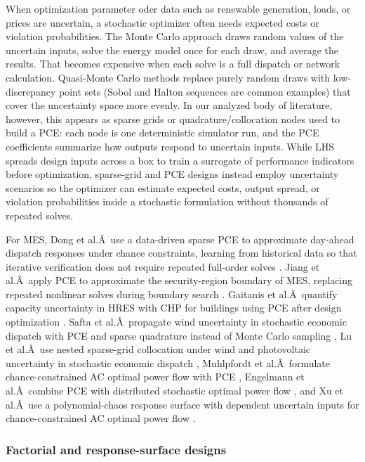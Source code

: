 \documentclass[final,5p,times,twocolumn]{elsarticle}
\begin{document}
When optimization parameter oder data such as renewable generation,
loads, or prices are uncertain, a stochastic optimizer often needs
expected costs or violation probabilities. The Monte Carlo approach
draws random values of the uncertain inputs, solve the energy model once
for each draw, and average the results. That becomes expensive when each
solve is a full dispatch or network calculation. Quasi-Monte Carlo
methods replace purely random draws with low-discrepancy point sets
(Sobol and Halton sequences are common examples) that cover the
uncertainty space more evenly. In our analyzed body of literature,
however, this appears as sparse grids or quadrature/collocation nodes
used to build a PCE: each node is one deterministic simulator run, and
the PCE coefficients summarize how outputs respond to uncertain inputs.
While LHS spreads design inputs across a box to train a surrogate of
performance indicators before optimization, sparse-grid and PCE designs
instead employ uncertainty scenarios so the optimizer can estimate
expected costs, output spread, or violation probabilities inside a
stochastic formulation without thousands of repeated solves.

For MES, Dong et al.Â~use a data-driven sparse PCE to approximate
day-ahead dispatch responses under chance constraints, learning from
historical data so that iterative verification does not require repeated
full-order solves \cite{Dong2023}. Jiang et al.Â~apply PCE to approximate the
security-region boundary of MES, replacing repeated nonlinear solves
during boundary search \cite{Jiang2026620}. Gaitanis et al.Â~quantify
capacity uncertainty in HRES with CHP for buildings using PCE after
design optimization \cite{Gaitanis2026}. Safta et al.Â~propagate wind
uncertainty in stochastic economic dispatch with PCE and sparse
quadrature instead of Monte Carlo sampling \cite{Safta20172535}, Lu et
al.Â~use nested sparse-grid collocation under wind and photovoltaic
uncertainty in stochastic economic dispatch \cite{Lu201991827}, Muhlpfordt
et al.Â~formulate chance-constrained AC optimal power flow with PCE
\cite{Muhlpfordt20194806}, Engelmann et al.Â~combine PCE with distributed
stochastic optimal power flow \cite{Engelmann20186188}, and Xu et al.Â~use a
polynomial-chaos response surface with dependent uncertain inputs for
chance-constrained AC optimal power flow \cite{Xu20212696}.

\subsubsection{Factorial and response-surface designs}
\end{document}

